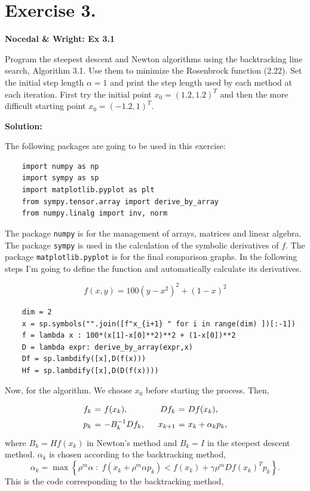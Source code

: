 
\section*{Exercise 3.}

\textbf{Nocedal \& Wright: Ex 3.1 }

Program the steepest descent and Newton algorithms using the backtracking line search, Algorithm 3.1. Use them to minimize the Rosenbrock function (2.22). Set the initial step length $\alpha = 1$ and print the step length used by each method at each iteration. First try the initial point $x_0 = (1.2,1.2)^T$ and then the more difficult starting point $x_0 = (-1.2, 1)^T$.

\textbf{Solution:}

The following packages are going to be used in this exercise:

\begin{verbatim}
    import numpy as np
    import sympy as sp
    import matplotlib.pyplot as plt
    from sympy.tensor.array import derive_by_array
    from numpy.linalg import inv, norm  
\end{verbatim}

The package \texttt{numpy} is for the management of arrays, matrices and linear algebra. The package \texttt{sympy} is used in the calculation of the symbolic derivatives of $f$. The package \texttt{matplotlib.pyplot} is for the final comparison graphs. In the following steps I'm going to define the function and automatically calculate its derivatives.

\[ f(x,y) = 100(y-x^2)^2 + (1-x)^2 \]

\begin{verbatim}
    dim = 2
    x = sp.symbols("".join([f"x_{i+1} " for i in range(dim) ])[:-1])
    f = lambda x : 100*(x[1]-x[0]**2)**2 + (1-x[0])**2
    D = lambda expr: derive_by_array(expr,x)
    Df = sp.lambdify([x],D(f(x)))
    Hf = sp.lambdify([x],D(D(f(x))))
\end{verbatim}

Now, for the algorithm. We choose $x_0$ before starting the process. Then,
\[ \everymath{\displaystyle}
\arraycolsep=1.8pt\def\arraystretch{1.5}
\begin{array}{rclcrcl}
    f_k & = & f(x_k), & \hspace{1em}  & Df_k & = & Df(x_k),\\
    p_k & = & -B_k^{-1} Df_k, & \hspace{1em}  & x_{k+1} & = & x_{k} + \alpha_k p_k,
\end{array} \]
where $B_k = Hf(x_k)$ in Newton's method and $B_k = I$ in the steepest descent method. $\alpha_k$ is chosen according to the backtracking method,
\[ \alpha_k = \max\left\{ \rho^m \alpha \;:\; f(x_k + \rho^m \alpha p_k ) < f(x_k) + \gamma \rho^m Df(x_k)^T p_k \right\}. \]
This is the code corresponding to the backtracking method,

